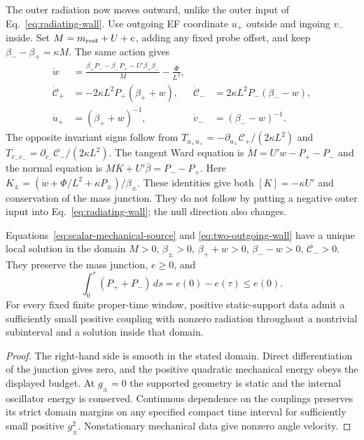 The outer radiation now moves outward, unlike the outer input of
Eq.~\eqref{eq:radiating-wall}. Use outgoing EF coordinate $u_+$ outside
and ingoing $v_-$ inside. Set $M=m_{\rm rest}+U+e$, adding any fixed
probe offset, and keep $\beta_--\beta_+=\kappa M$. The same action gives
\begin{align}\label{eq:two-outgoing-wall}
 \dot w&=\frac{\beta_+P_- -\beta_-P_+ -U'\beta_+\beta_-}{M}
                       -\frac\Phi{L^2},\\
 \dot{\mathcal C}_+&=-2\kappa L^2P_+(\beta_++w),&
 \dot{\mathcal C}_-&= 2\kappa L^2P_-(\beta_--w),\nonumber\\
 \dot u_+&=(\beta_++w)^{-1},&
 \dot v_-&=(\beta_--w)^{-1}.\nonumber
\end{align}
The opposite invariant signs follow from
$T_{u_+u_+}=-\partial_{u_+}\mathcal C_+/(2\kappa L^2)$ and
$T_{v_-v_-}=\partial_{v_-}\mathcal C_-/(2\kappa L^2)$.
The tangent Ward equation is $\dot M=U'w-P_+-P_-$ and the normal
equation is $M\overline K+U'\overline\beta=P_--P_+$.
Here $K_\pm=(\dot w+\Phi/L^2+\kappa P_\pm)/\beta_\pm$.
These identities give both $[K]=-\kappa U'$ and conservation of the
mass junction. They do not follow by putting a negative outer input
into Eq.~\eqref{eq:radiating-wall}; the null direction also changes.

\begin{proposition}
\label{prop:mechanical-source-window}
Equations~\eqref{eq:scalar-mechanical-source} and
\eqref{eq:two-outgoing-wall} have a unique local solution in the domain
$M>0$, $\beta_\pm>0$, $\beta_++w>0$, $\beta_--w>0$, $\mathcal C_->0$.
They preserve the mass junction, $e\ge0$, and
\begin{equation}\label{eq:mechanical-source-budget}
 \int_0^\tau(P_++P_-)\,ds=e(0)-e(\tau)\le e(0).
\end{equation}
For every fixed finite proper-time window, positive static-support data
admit a sufficiently small positive coupling with nonzero radiation
throughout a nontrivial subinterval and a solution inside that domain.
\end{proposition}
\begin{proof}
The right-hand side is smooth in the stated domain. Direct differentiation
of the junction gives zero, and the positive quadratic mechanical energy
obeys the displayed budget. At $g_\pm=0$ the supported geometry is static
and the internal oscillator energy is conserved. Continuous dependence
on the couplings preserves its strict domain margins on any specified
compact time interval for sufficiently small positive $g_\pm^2$.
Nonstationary mechanical data give nonzero angle velocity.
\end{proof}

